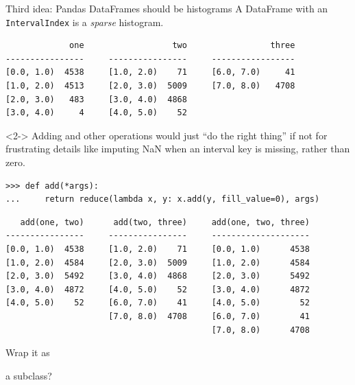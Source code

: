 \documentclass[aspectratio=169]{beamer}
\begin{document}
\begin{frame}[fragile]{Third idea: Pandas DataFrames should be histograms}
\vspace{-0.25 cm}
A DataFrame with an {\tt\normalsize IntervalIndex} is a {\it sparse} histogram.

\scriptsize
\vspace{-0.35 cm}
\begin{verbatim}
             one                  two                 three
----------------     ----------------     -----------------
[0.0, 1.0)  4538     [1.0, 2.0)    71     [6.0, 7.0)     41
[1.0, 2.0)  4513     [2.0, 3.0)  5009     [7.0, 8.0)   4708
[2.0, 3.0)   483     [3.0, 4.0)  4868
[3.0, 4.0)     4     [4.0, 5.0)    52
\end{verbatim}

\normalsize
\vspace{-0.35 cm}
\begin{uncoverenv}<2->
Adding and other operations would just ``do the right thing'' if not for frustrating details like imputing NaN when an interval key is missing, rather than zero.

\scriptsize
\begin{verbatim}
>>> def add(*args):
...     return reduce(lambda x, y: x.add(y, fill_value=0), args)
\end{verbatim}

\scriptsize
\vspace{-0.35 cm}
\begin{verbatim}
   add(one, two)      add(two, three)     add(one, two, three)
----------------     ----------------     --------------------
[0.0, 1.0)  4538     [1.0, 2.0)    71     [0.0, 1.0)      4538
[1.0, 2.0)  4584     [2.0, 3.0)  5009     [1.0, 2.0)      4584
[2.0, 3.0)  5492     [3.0, 4.0)  4868     [2.0, 3.0)      5492
[3.0, 4.0)  4872     [4.0, 5.0)    52     [3.0, 4.0)      4872
[4.0, 5.0)    52     [6.0, 7.0)    41     [4.0, 5.0)        52
                     [7.0, 8.0)  4708     [6.0, 7.0)        41
                                          [7.0, 8.0)      4708
\end{verbatim}

\vspace{-2 cm}
\large
\hfill Wrap it \mbox{as\hspace{0.3 cm}}

\hfill a subclass?
\end{uncoverenv}
\end{frame}
\end{document}
